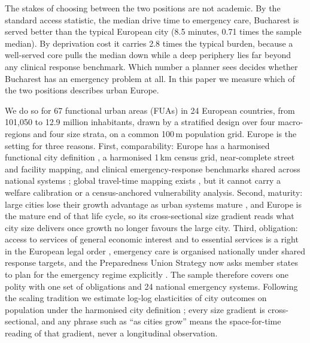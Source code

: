 \documentclass[11pt]{article}
\begin{document}
The stakes of choosing between the two positions are not academic. By the
standard access statistic, the median drive time to emergency care,
Bucharest is served better than the typical European city (8.5 minutes,
0.71 times the sample median). By deprivation cost it carries 2.8 times the
typical burden, because a well-served core pulls the median down while a
deep periphery lies far beyond any clinical response benchmark. Which
number a planner sees decides whether Bucharest has an emergency problem
at all. In this paper we measure which of the two positions describes
urban Europe.

We do so for 67 functional urban areas (FUAs) in 24 European countries,
from 101{,}050 to 12.9 million inhabitants, drawn by a stratified design
over four macro-regions and four size strata, on a common 100\,m population
grid. Europe is the setting for three reasons. First, comparability:
Europe has a harmonised functional city definition \citep{dijkstra2019fua},
a harmonised 1\,km census grid, near-complete street and facility mapping,
and clinical emergency-response benchmarks shared across national systems
\citep{pons2005response,blanchard2012response,peleg2004ems}; global
travel-time mapping exists \citep{weiss2020healthcare,wu2025global}, but
it cannot carry a welfare calibration or a census-anchored vulnerability
analysis. Second, maturity: large cities lose their growth advantage as
urban systems mature \citep{musso2026cities}, and Europe is the mature end
of that life cycle, so its cross-sectional size gradient reads what city
size delivers once growth no longer favours the large city. Third,
obligation: access to services of general economic interest and to
essential services is a right in the European legal order
\citep{eu2012charter,eu2017pillar}, emergency care is organised nationally
under shared response targets, and the Preparedness Union Strategy now asks
member states to plan for the emergency regime explicitly
\citep{ec2025preparedness}. The sample therefore covers one polity with one
set of obligations and 24 national emergency systems. Following the scaling
tradition we estimate log-log elasticities of city outcomes on population
\citep{bettencourt2007growth} under the harmonised city definition
\citep{musso2026cities}; every size gradient is cross-sectional, and any
phrase such as ``as cities grow'' means the space-for-time reading of that
gradient, never a longitudinal observation.
\end{document}
